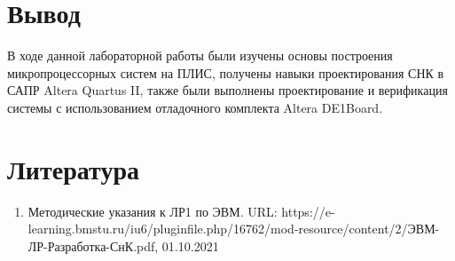 \documentclass[12pt]{report}
\begin{document}
\chapter{Вывод}

В ходе данной лабораторной работы были изучены основы построения микропроцессорных систем на ПЛИС, получены навыки проектирования СНК в САПР Altera Quartus II, также были выполнены проектирование и верификация системы с использованием отладочного комплекта Altera DE1Board.

\chapter*{Литература}
\begin{enumerate}
	\item Методические указания к ЛР1 по ЭВМ. URL: https://e-learning.bmstu.ru/iu6/pluginfile.php/16762/mod-resource/content/2/ЭВМ-ЛР-Разработка-СнК.pdf, 01.10.2021

\end{enumerate}
	

\end{document}
